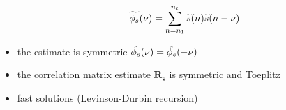 \begin{itemize}
\begin{equation*}\widetilde{\phi_{s}}(\nu)=\sum^{n_t}_{n = n_1}\widetilde{s}(n)\widetilde{s}(n - \nu)\end{equation*}

\item the estimate is symmetric \begin{math}\hat{\phi_{s}}(\nu) = \hat{\phi_{s}}(-\nu)\end{math}

\item the correlation matrix estimate \begin{math}\mathbf{R_s}\end{math} is symmetric and Toeplitz

\item fast solutions (Levinson-Durbin recursion)


\end{itemize}
